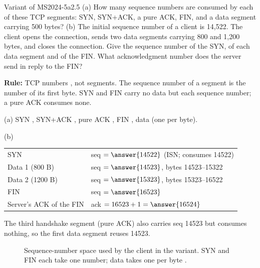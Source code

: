 \begin{question}{Variant of MS2024-5a}{2.5}
(a) How many sequence numbers are consumed by each of these TCP segments: SYN, SYN+ACK, a pure ACK, FIN, and a data segment carrying 500 bytes?
(b) The initial sequence number of a client is 14,522. The client opens the connection, sends two data segments carrying 800 and 1,200 bytes, and closes the connection. Give the sequence number of the SYN, of each data segment and of the FIN. What acknowledgment number does the server send in reply to the FIN?
\end{question}
\begin{solution}
\textbf{Rule:} TCP numbers , not segments. The sequence number of a segment is the number of its first byte. SYN and FIN carry no data but each  sequence number; a pure ACK consumes none.

(a) SYN , SYN+ACK , pure ACK , FIN , data  (one per byte).

(b) \begin{tabular}[t]{@{}ll@{}}
SYN & seq $=\answer{14522}$ (ISN; consumes 14522)\\
Data 1 (800 B) & seq $=\answer{14523}$, bytes 14523--15322\\
Data 2 (1200 B) & seq $=\answer{15323}$, bytes 15323--16522\\
FIN & seq $=\answer{16523}$\\
Server's ACK of the FIN & ack $=16523+1=\answer{16524}$
\end{tabular}

The third handshake segment (pure ACK) also carries seq 14523 but consumes nothing, so the first data segment reuses 14523.
\end{solution}

\begin{figure}[H]\centering
{}
\caption{Sequence-number space used by the client in the variant. SYN and FIN each take one number; data takes one per byte .}\end{figure}

